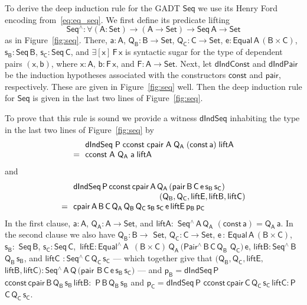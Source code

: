 \documentclass[sigplan,10pt,anonymous,review]{acmart}
\begin{document}
To derive the deep induction rule for the GADT $\mathsf{Seq}$ we use
its Henry Ford encoding from~\eqref{eq:eq_seq}.  We first define its
predicate lifting
\[\mathsf{Seq^\wedge : \forall (A : Set) \to (A \to
  Set) \to Seq\,A \to Set}\] as in Figure~\ref{fig:seq}. There,
$\mathsf{a : A}$, $\mathsf{Q_B : B \to Set}$, $\mathsf{Q_C : C \to
  Set}$, $\mathsf{e : Equal\,A\,(B \times C)}$, $\mathsf{s_B :
  Seq\,B}$, $\mathsf{s_C : Seq\,C}$, and $\mathsf{\exists [x]\, F
  \,x}$ is syntactic sugar for the type of dependent pairs
$\mathsf{(x,b)}$, where $\mathsf{x : A}$, $\mathsf{b : F\, x}$, and
$\mathsf{F : A \to Set}$. Next, let $\mathsf{dIndConst}$ and
$\mathsf{dIndPair}$ be the induction hypotheses associated with the
constructors $\mathsf{const}$ and $\mathsf{pair}$, respectively. These
are given in Figure~\ref{fig:seq} well. Then the deep induction rule
for $\mathsf{Seq}$ is given in the last two lines of
Figure~\ref{fig:seq}.

To prove that this rule is sound we provide a witness
$\mathsf{dIndSeq}$ inhabiting the type in the last two lines of
Figure~\ref{fig:seq} by
\[\begin{array}{ll}
& \!\!\mathsf{dIndSeq\;P\;cconst\;cpair\;A\;Q_A\;(const\,a)\;liftA}\\
= & \!\!\mathsf{cconst\;A}$ $\mathsf{Q_A\;a\;liftA}
\end{array}\]
and
\[\begin{array}{ll}
 &\!\!\mathsf{dIndSeq\,P\,cconst\,cpair\,A\,Q_A\,(pair\,B\,C\,e\,s_B\,s_C)}\\
 & \hspace*{1.4in}\mathsf{(Q_B, Q_C, liftE, liftB, liftC)}\\
= &\!\! \mathsf{cpair\,A\,B\,C\,Q_A\,Q_B\,Q_C\,s_B\,s_C\,e\,liftE\,
  p_B\,p_C}
\end{array}\]
In the first clause, $\mathsf{a : A}$, $\mathsf{Q_A : A
  \to Set}$, and $\mathsf{liftA :}$
$\mathsf{Seq^{\wedge}\,A\,Q_A}$ $\mathsf{(const\,a) = Q_A\,a}$. In the second
clause we also have $\mathsf{Q_B : B \to}$ $\mathsf{Set}$, $\mathsf{Q_C : C \to
  Set}$, $\mathsf{e \,:\, Equal\,A\,(B \times C)}$,\, $\mathsf{s_B :}$
$\mathsf{Seq\,B}$, $\mathsf{s_C : Seq\,C}$,\, $\mathsf{liftE :
  Equal^{\wedge}\,A\,}$ $\mathsf{(B \times C)\, Q_A\, (Pair^\wedge
  \,B\,C\,Q_B}$ $\mathsf{Q_C) \, e}$, $\mathsf{liftB :
  Seq^{\wedge}\,B}$ $\mathsf{Q_B\,s_B}$, and $\mathsf{liftC}$ $\mathsf{ :
  Seq^{\wedge}\,C\,Q_C\,s_C}$ --- which together give that
$\mathsf{(Q_B, Q_C, liftE,}$ $\mathsf{liftB, liftC) :
  Seq^{\wedge}\,A\,Q\,(pair}$ $\mathsf{B\,C\,e\,s_B\,s_C)}$ --- and
$\mathsf{p_B} = \mathsf{dIndSeq\,P}$
$\mathsf{cconst\,cpair\,B\,Q_B\,s_B\,liftB :}$
$\mathsf{P\,B\,Q_B\,s_B}$ and $\mathsf{p_C} =\mathsf{dIndSeq\,P}$
$\mathsf{cconst\,cpair\,C\,Q_C\,s_C\,liftC : P}$
$\mathsf{C\,Q_C\,s_C}$.
\end{document}
